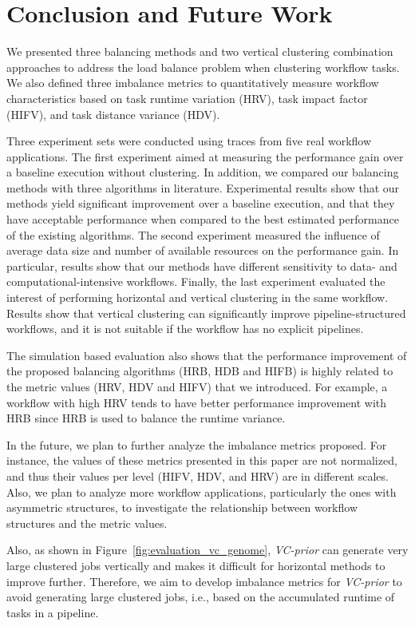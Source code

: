 \documentclass[final,5p,times,twocolumn]{elsarticle}
\begin{document}
\section{Conclusion and Future Work}

We presented three balancing methods and two vertical clustering combination approaches to address the load balance problem when clustering workflow tasks. We also defined three imbalance metrics to quantitatively measure workflow characteristics based on task runtime variation (HRV), task impact factor (HIFV), and task distance variance (HDV).

Three experiment sets were conducted using traces from five real workflow applications. The first experiment aimed at measuring the performance gain over a baseline execution without clustering. In addition, we compared our balancing methods with three algorithms in literature. Experimental results show that our methods yield significant improvement over a baseline execution, and that they have acceptable performance when compared to the best estimated performance of the existing algorithms. The second experiment measured the influence of average data size and number of available resources on the performance gain. In particular, results show that our methods have different sensitivity to data- and computational-intensive workflows. Finally, the last experiment evaluated the interest of performing horizontal and vertical clustering in the same workflow. Results show that vertical clustering can significantly improve pipeline-structured workflows, and it is not suitable if the workflow has no explicit pipelines.

The simulation based evaluation also shows that the performance improvement of the proposed balancing algorithms (HRB, HDB and HIFB) is highly related to the metric values (HRV, HDV and HIFV) that we introduced. For example, a workflow with high HRV tends to have better performance improvement with HRB since HRB is used to balance the runtime variance. 

In the future, we plan to further analyze the imbalance metrics proposed. For instance, the values of these metrics presented in this paper are not normalized, and thus their values per level (HIFV, HDV, and HRV) are in different scales. Also, we plan to analyze more workflow applications, particularly the ones with asymmetric structures, to investigate the relationship between workflow structures and the metric values. 

Also, as shown in Figure~\ref{fig:evaluation_vc_genome}, \emph{VC-prior} can generate very large clustered jobs vertically and makes it difficult for horizontal methods to improve further. Therefore, we aim to develop imbalance metrics for \emph{VC-prior} to avoid generating large clustered jobs, i.e., based on the accumulated runtime of tasks in a pipeline. 
\end{document}
